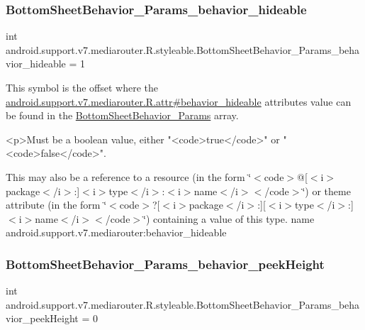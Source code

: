 \subsubsection{\texorpdfstring{Bottom\+Sheet\+Behavior\+\_\+\+Params\+\_\+behavior\+\_\+hideable}{BottomSheetBehavior\_Params\_behavior\_hideable}}
{\footnotesize\ttfamily int android.\+support.\+v7.\+mediarouter.\+R.\+styleable.\+Bottom\+Sheet\+Behavior\+\_\+\+Params\+\_\+behavior\+\_\+hideable = 1\hspace{0.3cm}{\ttfamily [static]}}

This symbol is the offset where the \hyperlink{classandroid_1_1support_1_1v7_1_1mediarouter_1_1R_1_1attr_aaa7332b338527a5f334ee93352f0ea50}{android.\+support.\+v7.\+mediarouter.\+R.\+attr\#behavior\+\_\+hideable} attribute\textquotesingle{}s value can be found in the \hyperlink{classandroid_1_1support_1_1v7_1_1mediarouter_1_1R_1_1styleable_a79256b2584517e9cb65dff8f9bc2bb71}{Bottom\+Sheet\+Behavior\+\_\+\+Params} array.

\begin{DoxyVerb}      <p>Must be a boolean value, either "<code>true</code>" or "<code>false</code>".
\end{DoxyVerb}
 

This may also be a reference to a resource (in the form \char`\"{}$<$code$>$@\mbox{[}$<$i$>$package$<$/i$>$\+:\mbox{]}$<$i$>$type$<$/i$>$\+:$<$i$>$name$<$/i$>$$<$/code$>$\char`\"{}) or theme attribute (in the form \char`\"{}$<$code$>$?\mbox{[}$<$i$>$package$<$/i$>$\+:\mbox{]}\mbox{[}$<$i$>$type$<$/i$>$\+:\mbox{]}$<$i$>$name$<$/i$>$$<$/code$>$\char`\"{}) containing a value of this type.  name android.\+support.\+v7.\+mediarouter\+:behavior\+\_\+hideable \mbox{\label{classandroid_1_1support_1_1v7_1_1mediarouter_1_1R_1_1styleable_a8c29b649bf80308e39a67a58955949e7}} 
\subsubsection{\texorpdfstring{Bottom\+Sheet\+Behavior\+\_\+\+Params\+\_\+behavior\+\_\+peek\+Height}{BottomSheetBehavior\_Params\_behavior\_peekHeight}}
{\footnotesize\ttfamily int android.\+support.\+v7.\+mediarouter.\+R.\+styleable.\+Bottom\+Sheet\+Behavior\+\_\+\+Params\+\_\+behavior\+\_\+peek\+Height = 0\hspace{0.3cm}{\ttfamily [static]}}

